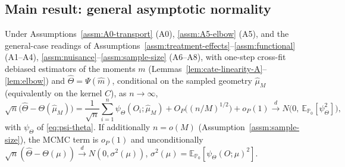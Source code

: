 \subsection{Main result: general asymptotic normality}

\begin{theorem}
\label{thm:general}
Under Assumptions~\ref{assm:A0-transport} (A0), \ref{assm:A5-elbow} (A5), and the general-case
readings of Assumptions~\ref{assm:treatment-effects}--\ref{assm:functional} (A1--A4),
\ref{assm:nuisance}--\ref{assm:sample-size} (A6--A8), with one-step cross-fit debiased
estimators of the moments $m$ (Lemmas~\ref{lem:cate-linearity-A}--\ref{lem:elbow}) and
$\hat\Theta=\Psi(\hat m)$, conditional on the sampled geometry $\hat{\mu}_M$ (equivalently on
the kernel $C$), as $n\to\infty$,
\begin{equation}
\sqrt{n}\big(\hat\Theta - \Theta(\hat{\mu}_M)\big)
 = \frac{1}{\sqrt{n}}\sum_{i=1}^n \psi_\Theta(O_i;\hat{\mu}_M)
 + O_P\!\big((n/M)^{1/2}\big) + o_P(1)
 \xrightarrow{d} N\!\big(0,\ \mathbb{E}_{\mathbb{P}_0}[\psi_\Theta^2]\big),
\end{equation}
with $\psi_\Theta$ of \eqref{eq:psi-theta}. If additionally $n=o(M)$
(Assumption~\ref{assm:sample-size}), the MCMC term is $o_P(1)$ and unconditionally
$\sqrt{n}(\hat\Theta-\Theta(\mu))\xrightarrow{d}N(0,\sigma^2(\mu))$,
$\sigma^2(\mu)=\mathbb{E}_{\mathbb{P}_0}[\psi_\Theta(O;\mu)^2]$.
\end{theorem}

